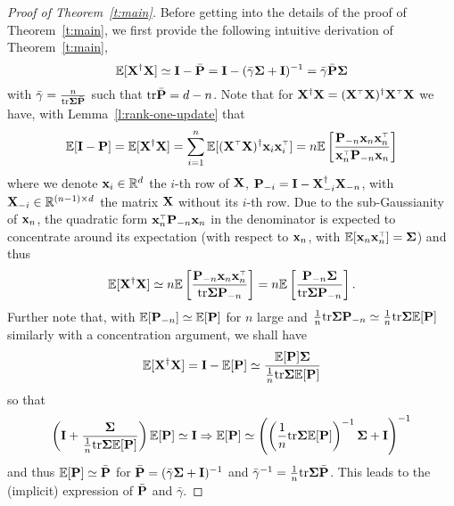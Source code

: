 \documentclass[11pt]{article}
\begin{document}
\begin{proof}[Proof of Theorem~\ref{t:main}]

Before getting into the details of the proof of Theorem~\ref{t:main}, we first provide the following intuitive derivation of Theorem~\ref{t:main}, 
\[
  \E[\X^\dagger \X] \simeq \I - \bar \P  = \I -  (\bar \gamma \Sigmab + \I)^{-1} = \bar \gamma \bar \P \Sigmab
\]
with $\bar \gamma = \frac{n}{\tr \Sigmab \bar \P}$ such that $\tr \bar \P = d - n$. Note that for $\X^\dagger \X = (\X^\top \X)^\dagger \X^\top \X$ we have, with Lemma~\ref{l:rank-one-update} that
\[
  \E[\I - \P] = \E[\X^\dagger \X] = \sum_{i=1}^n \E[(\X^\top \X)^\dagger \x_i \x_i^\top]  = n \E \left[\frac{ \P_{-n} \x_n \x_n^\top }{ \x_n^\top \P_{-n} \x_n } \right]
\]
where we denote $\x_i \in \mathbb R^d$ the $i$-th row of $\X$, $\P_{-i} = \I - \X_{-i}^\dagger \X_{-n}$, with $\X_{-i} \in \mathbb R^{(n-1) \times d}$ the matrix $\X$ without its $i$-th row. Due to the sub-Gaussianity of $\x_n$, the quadratic form $\x_n^\top \P_{-n} \x_n$ in the denominator is expected to concentrate around its expectation (with respect to $\x_n$, with $\E[\x_n \x_n^\top] = \Sigmab$) and thus
\[
  \E[\X^\dagger \X] \simeq n \E \left[\frac{ \P_{-n} \x_n \x_n^\top }{ \tr \Sigmab \P_{-n} } \right] = n\E \left[\frac{ \P_{-n} \Sigmab }{ \tr \Sigmab \P_{-n} } \right].
\]
Further note that, with $\E[\P_{-n}] \simeq \E[\P]$ for $n$ large and $\frac1n \tr \Sigmab \P_{-n} \simeq \frac1n \tr \Sigmab \E[\P]$ similarly with a concentration argument, we shall have
\[
  \E[\X^\dagger \X] = \I - \E[\P] \simeq \frac{ \E[\P] \Sigmab }{ \frac1n \tr \Sigmab \E[\P] }
\]
so that
\[
  \left( \I +  \frac{\Sigmab}{ \frac1n \tr \Sigmab \E[\P] } \right) \E[\P] \simeq \I \Rightarrow \E[\P] \simeq \left( \left( \frac1n \tr \Sigmab \E[\P] \right)^{-1} \Sigmab + \I \right)^{-1}
\]
and thus $\E[\P] \simeq \bar \P$ for $\bar \P = (\bar \gamma \Sigmab + \I)^{-1}$ and $\bar \gamma^{-1} = \frac1n \tr \Sigmab \bar \P$. This leads to the (implicit) expression of $\bar \P $ and $ \bar \gamma$.

\bigskip


\end{proof}
\end{document}
